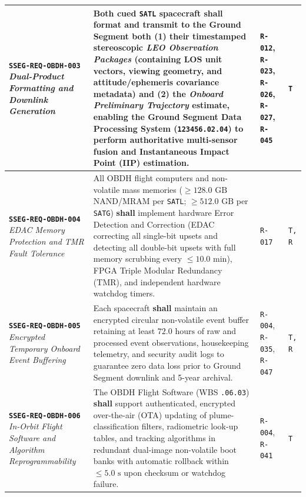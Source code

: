 \documentclass[11pt,a4paper]{article}
\providecommand{\abbr}[1]{#1}
\begin{document}
{\begin{longtable}{|>{\raggedright\arraybackslash}p{}|>{\raggedright\arraybackslash}p{}|>{\raggedright\arraybackslash}p{}|>{\raggedright\arraybackslash}p{}|}
\textbf{\texttt{SSEG-REQ-OBDH-003}} \newline \emph{Dual-Product Formatting and Downlink Generation} & Both cued \texttt{SATL} spacecraft \textbf{shall} format and transmit to the Ground Segment both (1) their timestamped stereoscopic \emph{LEO Observation Packages} (containing \abbr{LOS} unit vectors, viewing geometry, and attitude/ephemeris covariance metadata) and (2) the \emph{Onboard Preliminary Trajectory} estimate, enabling the Ground Segment Data Processing System (\texttt{123456.02.04}) to perform authoritative multi-sensor fusion and Instantaneous Impact Point (\abbr{IIP}) estimation. & \texttt{R-012}, \texttt{R-023}, \texttt{R-026}, \texttt{R-027}, \texttt{R-045} & \texttt{T} \\ \hline
\textbf{\texttt{SSEG-REQ-OBDH-004}} \newline \emph{EDAC Memory Protection and TMR Fault Tolerance} & All \abbr{OBDH} flight computers and non-volatile mass memories ($\ge 128.0\text{ GB}$ NAND/MRAM per \texttt{SATL}; $\ge 512.0\text{ GB}$ per \texttt{SATG}) \textbf{shall} implement hardware Error Detection and Correction (\abbr{EDAC} correcting all single-bit upsets and detecting all double-bit upsets with full memory scrubbing every $\le 10.0\text{ min}$), FPGA Triple Modular Redundancy (\abbr{TMR}), and independent hardware watchdog timers. & \texttt{R-017} & \texttt{T, R} \\ \hline
\textbf{\texttt{SSEG-REQ-OBDH-005}} \newline \emph{Encrypted Temporary Onboard Event Buffering} & Each spacecraft \textbf{shall} maintain an encrypted circular non-volatile event buffer retaining at least $72.0\text{ hours}$ of raw and processed event observations, housekeeping telemetry, and security audit logs to guarantee zero data loss prior to Ground Segment downlink and 5-year archival. & \texttt{R-004}, \texttt{R-035}, \texttt{R-047} & \texttt{T, R} \\ \hline
\textbf{\texttt{SSEG-REQ-OBDH-006}} \newline \emph{In-Orbit Flight Software and Algorithm Reprogrammability} & The \abbr{OBDH} Flight Software (\abbr{WBS} \texttt{.06.03}) \textbf{shall} support authenticated, encrypted over-the-air (\abbr{OTA}) updating of plume-classification filters, radiometric look-up tables, and tracking algorithms in redundant dual-image non-volatile boot banks with automatic rollback within $\le 5.0\text{ s}$ upon checksum or watchdog failure. & \texttt{R-004}, \newline \texttt{R-041} & \texttt{T} \\ \hline
\end{longtable}}
\end{document}
